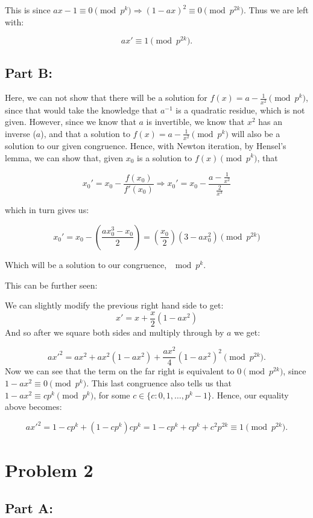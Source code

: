 \documentclass[12pt]{article}
\theoremstyle{moo}
\begin{document}
This is since $ax - 1 \equiv 0 \pmod{p^k} \Rightarrow \left(1 - ax \right)^2 \equiv 0 \pmod{p^{2k}}$. Thus we are left with:

\[
ax' \equiv 1 \pmod{p^{2k}}.
\]


\subsection*{Part B:}


Here, we can not show that there will be a solution for $f(x) = a - \frac{1}{x^2} \pmod{p^k}$, since that would take the knowledge that $a^{-1}$ is a quadratic residue, which is not given. However, since we know that $a$ is invertible, we know that $x^2$ has an inverse ($a$), and that a solution to $f(x) = a - \frac{1}{x^2} \pmod{p^k}$ will also be a solution to our given congruence. Hence, with Newton iteration, by Hensel's lemma, we can show that, given $x_0$ is a solution to $f(x) \pmod{p^k}$, that 

\[
x_0' =  x_0 - \frac{f(x_0)}{f'(x_0)}  \Rightarrow x_0' = x_0 - \frac{a-\frac{1}{x^2}}{\frac{2}{x^3}}
\]

which in turn gives us:


\[
x_0' = x_0 - \left( \frac{ax_0^3 - x_0}{2} \right) = \left( \frac{x_0}{2} \right) \left( 3 - ax_0^2 \right) \pmod{p^{2k}}
\]

Which will be a solution to our congruence, $\mod{p^k}$.

This can be further seen:

We can slightly modify the previous right hand side to get:
\[
x' = x + \frac{x}{2} \left( 1 - ax^2 \right)
\]
And so after we square both sides and multiply through by $a$ we get:


\[
ax'^2 = ax^2 + ax^2 \left( 1 - ax^2 \right) + \frac{ax^2}{4} \left( 1 - ax^2 \right)^2 \pmod{p^{2k}}.
\]
Now we can see that the term on the far right is equivalent to $0 \pmod{p^{2k}}$, since $1 - ax^2 \equiv 0 \pmod{p^k}$. This last congruence also tells us that $1 - ax^2 \equiv cp^k \pmod{p^k}$, for some $c \in \{c: 0, 1, \ldots, p^k-1\}$. Hence, our equality above becomes:

\[
ax'^2 = 1 - cp^k + \left( 1 - cp^k \right) cp^k = 1 - cp^k + cp^k + c^2p^{2k} \equiv 1 \pmod{p^{2k}}.
\]




\section*{Problem 2}
\subsection*{Part A:}
\end{document}
